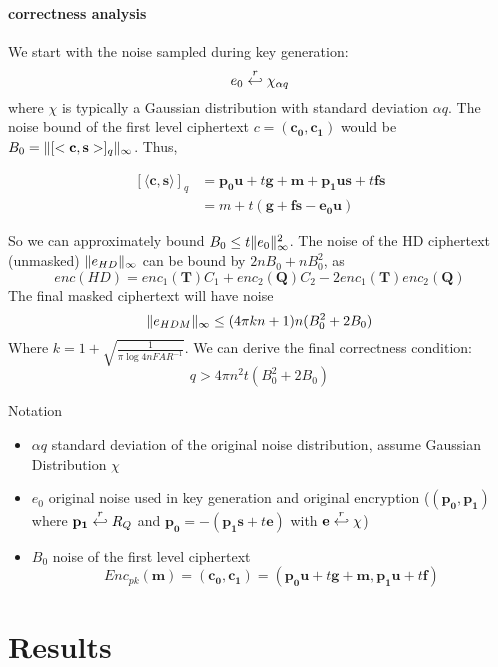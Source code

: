 \paragraph{correctness analysis}
We start with the noise sampled during key generation:
\[e_{0} \stackrel{r}{\hookleftarrow} \chi_{\alpha q}\] where \(\chi\) is typically a Gaussian
distribution with standard deviation \(\alpha q\). The noise bound of the first
level ciphertext \(c = (\mathbf{c_{0}, c_{1}})\) would be
\(B_{0} = \Vert [<\mathbf{c,s}>]_{q} \Vert_{\infty}\). Thus,

\begin{align*}
  \left[ \langle \mathbf{c, s} \rangle \right]_{q} &= \mathbf{p_{0}u} + t \mathbf{g} + \mathbf{m} + \mathbf{p_{1}us} + t \mathbf{fs}\\
                                                   &= m + t(\mathbf{g + fs -e_{0}u})
\end{align*}

So we can approximately bound \(B_{0} \leq t \Vert e_{0} \Vert_{\infty}^{2}\). The noise of
the HD ciphertext (unmasked) \(\Vert e_{HD} \Vert_{\infty}\) can be bound by
\(2nB_{0} + n B_{0}^{2}\), as
\[
  enc(HD) = enc_{1}(\mathbf{T})C_{1} + enc_{2}(\mathbf{Q})C_{2} - 2
  enc_{1}(\mathbf{T})enc_{2}(\mathbf{Q})
\]
The final masked ciphertext will have noise
\[
\Vert e_{HDM} \Vert_{\infty} \leq (4\pi kn + 1)n(B_{0}^{2} + 2B_{0})
\]
Where \(k = 1 + \sqrt{\frac{1}{\pi \log{4n FAR^{-1}}}}\). We can derive the
final correctness condition:
\[
q > 4 \pi n^{2} t (B_{0}^{2} + 2B_{0})
\]

Notation
\begin{itemize}
\item \(\alpha q\) standard deviation of the original noise distribution, assume
  Gaussian Distribution \(\chi\)
\item \(e_{0}\) original noise used in key generation and original encryption
  ($(\mathbf{p_0},\mathbf{p_1})$ where $\mathbf{p_1} \stackrel{r}{\hookleftarrow} R_Q$ and
  $\mathbf{p_0} = -(\mathbf{p_1}\mathbf{s} + t\mathbf{e})$ with
  $\mathbf{e} \stackrel{r}{\hookleftarrow} \chi$)
\item \(B_{0}\) noise of the first level ciphertext
  \[
    Enc_{pk}(\mathbf{m}) = (\mathbf{c_0},\mathbf{c_1}) = (\mathbf{p_0}\mathbf{u}
    + t\mathbf{g} + \mathbf{m}, \mathbf{p_1}\mathbf{u} + t\mathbf{f})
  \]
\end{itemize}
  
 


\section{Results}
\label{sec:secProcResult}


    

